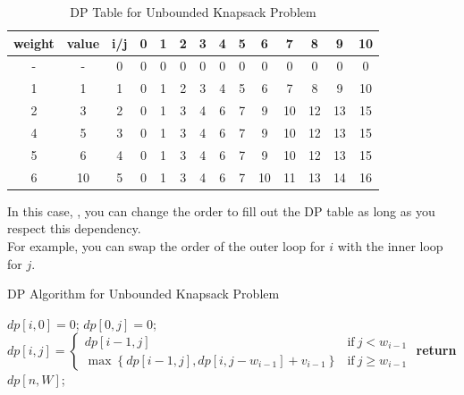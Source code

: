 \begin{table}[H]
\centering
\begin{tabular}{cc|c|c|c|c|c|c|c|c|c|c|c|c|}
\hline
weight & value & i/j & 0 & 1 & 2 & 3 & 4 & 5 & 6 & 7 & 8 & 9 & 10 \\ \hline
- & - & 0   & 0 & 0 & 0 & 0 & 0 & 0 & 0 & 0 & 0 & 0 & 0  \\ \hline
1 & 1 & 1   & 0 & 1 & 2 & 3 & 4 & 5 & 6 & 7 & 8 & 9 & 10 \\ \hline
2 & 3 & 2   & 0 & 1 & 3 & 4 & 6 & 7 & 9 & 10 & 12 & 13 & 15 \\ \hline
4 & 5 & 3   & 0 & 1 & 3 & 4 & 6 & 7 & 9 & 10 & 12 & 13 & 15 \\ \hline
5 & 6 & 4   & 0 & 1 & 3 & 4 & 6 & 7 & 9 & 10 & 12 & 13 & 15 \\ \hline
6 & 10 & 5   & 0 & 1 & 3 & 4 & 6 & 7 & 10 & 11 & 13 & 14 & 16 \\ \hline
\end{tabular}
\caption{DP Table for Unbounded Knapsack Problem}
\label{tab:unbounded_knapsack_dp}
\end{table}

In this case, {\color{blue}{$dp[i][j]$ depends only on the entries to its left in the same row ($i$), and the entry directly above it}}, you can change the order to fill out the DP table as long as you respect this dependency.\\

For example, you can swap the order of the outer loop for $i$ with the inner loop for $j$.
\begin{algorithm}[H]\label{algorithm:unbounded_knapsack_problem_2}
\caption{DP Algorithm for Unbounded Knapsack Problem}
\begin{algorithmic}[1]
 
    \State $dp[i, 0] = 0$;
\EndFor
{}  
    \State $dp[0, j] = 0$;
\EndFor
\For{{\color{magenta}{$j = 1$ to $W$}}}
    \For{{\color{magenta}{$i = 1$ to $n$}}}
        \State 
        $dp[i, j] = 
        \begin{cases} 
            dp[i - 1, j] & \text{if}\ j < w_{i-1}\\
            \max\left\{dp[i - 1, j], dp[i, j - w_{i-1}] + v_{i-1}\right\} & \text{if}\ j \geq w_{i-1}
        \end{cases}$
    \EndFor
\EndFor
\State \textbf{return} $dp[n, W]$;
\end{algorithmic}
\end{algorithm}

